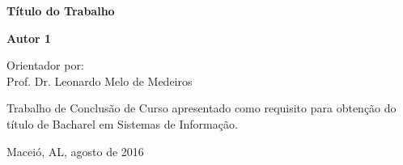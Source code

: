 \begin{titlepage}
\begin{center}
\begin{tabularx}{\linewidth}{ c X }
\end{tabularx}


\vfill

\LARGE

\textbf{Título do Trabalho}

\vfill

\Large

\textbf{Autor 1} \\

\vfill

\normalsize
Orientador por:\\
Prof. Dr. Leonardo Melo de Medeiros\\


\vfill

\hfill
\parbox{0.5\linewidth}{Trabalho de Conclusão de Curso apresentado como requisito para obtenção do título de Bacharel em Sistemas de Informação.}


\vfill

\large

%
%
%

Maceió, AL, agosto de 2016

\end{center}

\end{titlepage}
